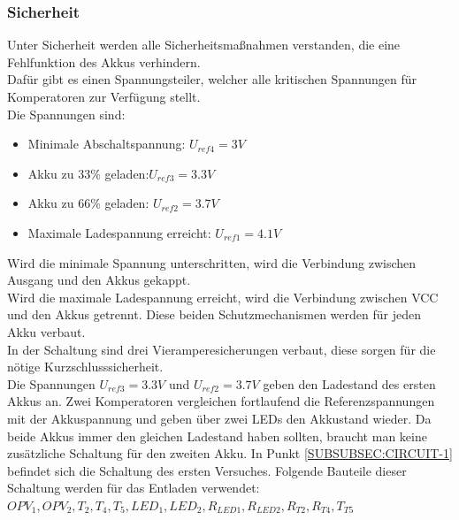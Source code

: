 \documentclass[12pt,a4paper]{article}
\begin{document}
{\subsubsection{Sicherheit}
\label{SUBSUBSEC:Security1}

Unter Sicherheit werden alle Sicherheitsmaßnahmen verstanden, die eine Fehlfunktion des Akkus verhindern. \\
Dafür gibt es einen Spannungsteiler, welcher alle kritischen Spannungen für Komperatoren zur Verfügung stellt. \\
Die Spannungen sind: 
\begin{itemize}
	\item{Minimale Abschaltspannung: $U_{ref4} = 3 V$}
	\item{Akku zu 33\% geladen:$ U_{ref3}=3.3V$}
	\item{Akku zu 66\% geladen: $U_{ref2} = 3.7V$}
	\item{Maximale Ladespannung erreicht: $U_{ref1} = 4.1V$}
\end{itemize}
Wird die minimale Spannung unterschritten, wird die Verbindung zwischen Ausgang und den Akkus gekappt. \\
Wird die maximale Ladespannung erreicht, wird die Verbindung zwischen VCC und den Akkus getrennt. Diese beiden Schutzmechanismen werden für jeden Akku verbaut.\\
In der Schaltung sind drei Vieramperesicherungen verbaut, diese sorgen für die nötige Kurzschlusssicherheit.  \\
Die Spannungen $ U_{ref3}=3.3V$ und $U_{ref2} = 3.7V$ geben den Ladestand des ersten Akkus an. Zwei Komperatoren vergleichen fortlaufend die Referenzspannungen mit der Akkuspannung und geben über zwei LEDs den Akkustand wieder. Da beide Akkus immer den gleichen Ladestand haben sollten, braucht man keine zusätzliche Schaltung für den zweiten Akku.
In Punkt \ref{SUBSUBSEC:CIRCUIT-1} befindet sich die Schaltung des ersten Versuches. Folgende Bauteile dieser Schaltung werden für das Entladen verwendet:\\ $OPV_1, OPV_2,T_2,T_4, T_5,LED_1,LED_2,R_{LED1},R_{LED2},R_{T2}, R_{T4},T_{T5}$ 
\newpage
}
\end{document}
